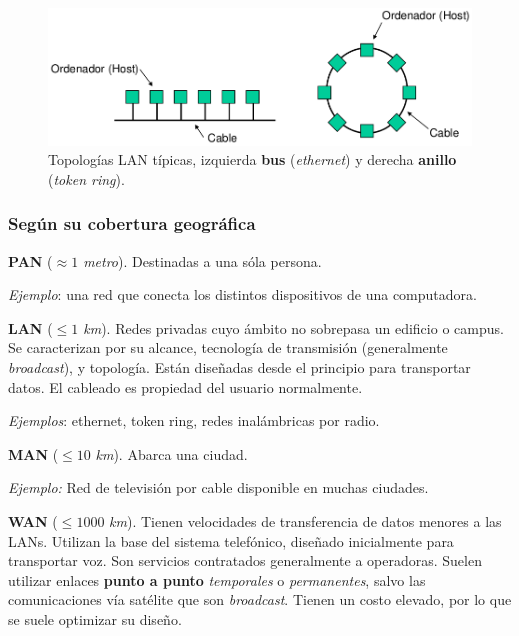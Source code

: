 \documentclass[10pt,a4paper]{article}
\begin{document}
\begin{figure}[ht!]
  \caption{Topologías LAN típicas, izquierda \textbf{bus} (\textit{ethernet}) y derecha \textbf{anillo} (\textit{token ring}).}
  \label{fig:topologia_lan}  
  \centerline{\includegraphics[width=0.7\textwidth-\fboxrule-\fboxrule]{imgs/topologia_lan.png}}  
\end{figure}

\subsubsection{Según su cobertura geográfica}

\begin{description}
\item \textbf{PAN} (\textit{$\approx 1$ metro}). Destinadas a una sóla persona.

\textit{Ejemplo}: una red que conecta los distintos dispositivos de una computadora.
\item \textbf{LAN} (\textit{$\leq 1$ km}). Redes privadas cuyo ámbito no sobrepasa un edificio o campus. Se caracterizan por su alcance, tecnología de transmisión (generalmente \textit{broadcast}), y topología. Están diseñadas desde el principio para transportar datos. El cableado es propiedad del usuario normalmente.

\textit{Ejemplos}: ethernet, token ring, redes inalámbricas por radio.

\item \textbf{MAN} ($\leq 10$ \textit{km}). Abarca una ciudad.

\textit{Ejemplo:} Red de televisión por cable disponible en muchas ciudades.

\item \textbf{WAN} ($\leq 1000$ \textit{km}). Tienen velocidades de transferencia de datos menores a las LANs. Utilizan la base del sistema telefónico, diseñado inicialmente para transportar voz. Son servicios contratados generalmente a operadoras. Suelen utilizar enlaces \textbf{punto a punto} \textit{temporales} o \textit{permanentes}, salvo las comunicaciones vía satélite que son \textit{broadcast}. Tienen un costo elevado, por lo que se suele optimizar su diseño.
\end{description}
\end{document}
